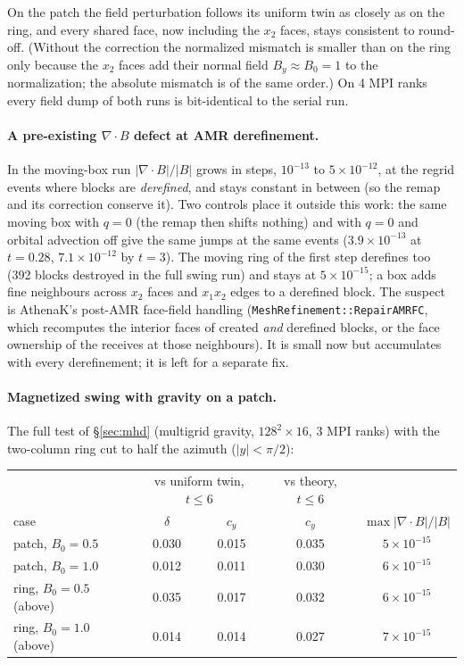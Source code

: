 \documentclass[11pt]{article}
\newcommand{\fn}[1]{\texttt{\small #1}}
\begin{document}
\noindent
On the patch the field perturbation follows its uniform twin as closely as on the ring, and
every shared face, now including the $x_2$ faces, stays consistent to round-off. (Without the
correction the normalized mismatch is smaller than on the ring only because the $x_2$ faces
add their normal field $B_y \approx B_0 = 1$ to the normalization; the absolute mismatch is
of the same order.) On 4 MPI ranks every field dump of both runs is bit-identical to the
serial run.

\paragraph{A pre-existing $\nabla\!\cdot\!B$ defect at AMR derefinement.} In the moving-box run
$|\nabla\!\cdot\!B|/|B|$ grows in steps, $10^{-13}$ to $5\times10^{-12}$, at the regrid events
where blocks are \emph{derefined}, and stays constant in between (so the remap and its
correction conserve it). Two controls place it outside this work: the same moving box with
$q = 0$ (the remap then shifts nothing) and with $q = 0$ and orbital advection off give the
same jumps at the same events ($3.9\times10^{-13}$ at $t = 0.28$, $7.1\times10^{-12}$ by
$t = 3$). The moving ring of the first step derefines too (392 blocks destroyed in the full
swing run) and stays at $5\times10^{-15}$; a box adds fine neighbours across $x_2$ faces and
$x_1x_2$ edges to a derefined block. The suspect is AthenaK's post-AMR face-field handling
(\fn{MeshRefinement::RepairAMRFC}, which recomputes the interior faces of created \emph{and}
derefined blocks, or the face ownership of the receives at those neighbours). It is small
now but accumulates with every derefinement; it is left for a separate fix.

\paragraph{Magnetized swing with gravity on a patch.} The full test of
\S\ref{sec:mhd} (multigrid gravity, $128^2\times16$, 3 MPI ranks) with the two-column ring cut
to half the azimuth ($|y| < \pi/2$):

\begin{center}
\small
\begin{tabular}{@{}lcccc@{}}
\toprule
& \multicolumn{2}{c}{vs uniform twin, $t \le 6$} & vs theory, $t \le 6$ & \\
case & $\delta$ & $c_y$ & $c_y$ & $\max|\nabla\!\cdot\!B|/|B|$ \\
\midrule
patch, $B_0 = 0.5$ & 0.030 & 0.015 & 0.035 & $5\times10^{-15}$ \\
patch, $B_0 = 1.0$ & 0.012 & 0.011 & 0.030 & $6\times10^{-15}$ \\
ring, $B_0 = 0.5$ (above) & 0.035 & 0.017 & 0.032 & $6\times10^{-15}$ \\
ring, $B_0 = 1.0$ (above) & 0.014 & 0.014 & 0.027 & $7\times10^{-15}$ \\
\bottomrule
\end{tabular}
\end{center}
\end{document}
